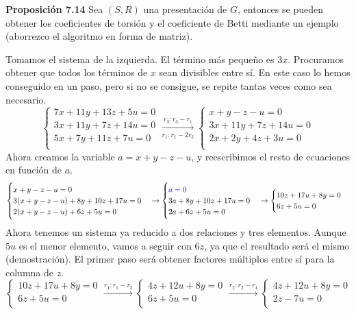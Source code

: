 \documentclass[a4paper, 11pt]{extarticle}
\newcommand{\propo}[1]{\textcolor{rojo}{\textbf{Proposición #1}}}
\begin{document}
\propo{7.14} Sea \((S,R)\) una presentación de \(G\), entonces se pueden
obtener los coeficientes de torsión y el coeficiente de Betti mediante un ejemplo (aborrezco el 
algoritmo en forma de matriz).

Tomamos el sistema de la izquierda. El término más pequeño es \(3x\). 
Procuramos obtener que todos los términos de 
\(x\) sean divisibles entre sí. En este caso lo hemos conseguido en un paso,
pero si no se consigue, se repite tantas veces como sea necesario.
$$\begin{cases}
7x+11y+13z+5u =  0 \\ 
3x+11y+7z+14u = 0 \\ 
5x+7y+11z+7u = 0 \\ 
\end{cases} \xrightarrow[r_1:r_1-2r_2]{r_3:r_3-r_1}  
\begin{cases}
x+y-z-u =  0 \\
3x+11y+7z+14u = 0 \\
2x+2y+4z+3u = 0 \\
\end{cases}$$
Ahora creamos la variable \(a = x + y - z - u\), y reescribimos el resto de
ecuaciones en función de \(a\).
$$\begin{cases}
x+y-z-u =  0 \\ 
3(x+y-z-u)+8y+10z +17u= 0 \\ 
2(x+y-z-u) + 6z +5u = 0 \\ 
\end{cases} \rightarrow 
\begin{cases}
\textcolor{blue}{a =  0} \\ 
3a+8y+10z+17u = 0 \\ 
2a + 6z +5u = 0 \\ 
\end{cases} \rightarrow
\begin{cases} 
10z + 17u + 8y= 0 \\ 
6z +5u = 0 \\ 
\end{cases}$$
Ahora tenemos un sistema ya reducido a dos relaciones y tres elementos. Aunque \(5u\)
es el menor elemento, vamos a seguir con \(6z\), ya que el resultado será el
mismo (demostración). El primer paso será obtener factores múltiplos entre sí para la columna
de \(z\).
$$\begin{cases}
10z+17u+8y=0\\
6z+5u=0\\
\end{cases} \xrightarrow{r_1:r_1-r_2}
\begin{cases}
4z+12u+8y=0\\
6z+5u=0\\
\end{cases} \xrightarrow{r_2:r_2-r_1} 
\begin{cases}
4z+12u+8y=0\\
2z-7u=0\\
\end{cases}$$
\end{document}
